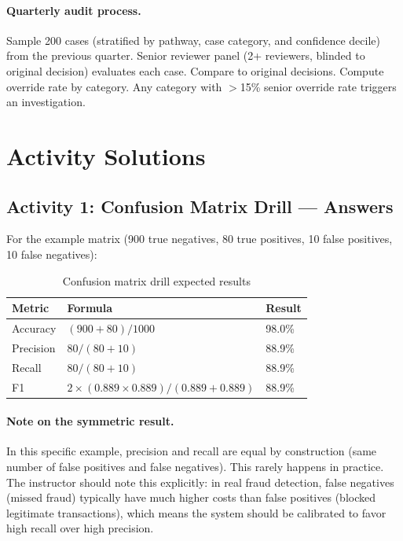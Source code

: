 \paragraph{Quarterly audit process.}

Sample 200 cases (stratified by pathway, case category, and confidence decile) from the previous quarter. Senior reviewer panel (2+ reviewers, blinded to original decision) evaluates each case. Compare to original decisions. Compute override rate by category. Any category with $>$15\% senior override rate triggers an investigation.

\section{Activity Solutions}

\subsection{Activity 1: Confusion Matrix Drill --- Answers}

For the example matrix (900 true negatives, 80 true positives, 10 false positives, 10 false negatives):

\begin{table}[htbp]
\caption{Confusion matrix drill expected results}
\label{tab:confusion-drill}
\centering
\begin{tabular}{@{}lll@{}}
\toprule
\textbf{Metric} & \textbf{Formula} & \textbf{Result} \\
\midrule
Accuracy & $(900 + 80) / 1000$ & 98.0\% \\
Precision & $80 / (80 + 10)$ & 88.9\% \\
Recall & $80 / (80 + 10)$ & 88.9\% \\
F1 & $2 \times (0.889 \times 0.889) / (0.889 + 0.889)$ & 88.9\% \\
\bottomrule
\end{tabular}
\end{table}

\paragraph{Note on the symmetric result.}

In this specific example, precision and recall are equal by construction (same number of false positives and false negatives). This rarely happens in practice. The instructor should note this explicitly: in real fraud detection, false negatives (missed fraud) typically have much higher costs than false positives (blocked legitimate transactions), which means the system should be calibrated to favor high recall over high precision.

